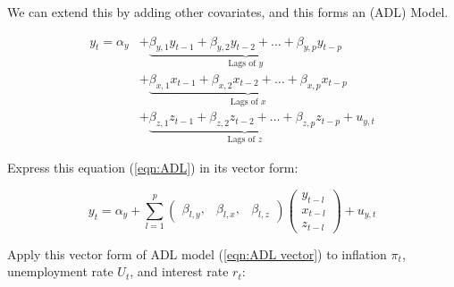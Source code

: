         We can extend this by adding other covariates, and this forms an  (ADL) Model.

        \begin{equation}
            \begin{split}
                y_t = \alpha_y &+ \underbrace{\beta_{y,1} y_{t-1} + \beta_{y,2} y_{t-2} + \dots + \beta_{y,p} y_{t-p}}_{\text{Lags of } y}\\ &+
                \underbrace{\beta_{x,1} x_{t-1} + \beta_{x,2} x_{t-2} + \dots + \beta_{x,p} x_{t-p}}_{\text{Lags of } x} \\ &+ \underbrace{\beta_{z,1} z_{t-1} + \beta_{z,2} z_{t-2} + \dots + \beta_{z,p} z_{t-p}}_{\text{Lags of } z} + u_{y,t}
            \end{split}
            \label{eqn:ADL}
        \end{equation}
        
        Express this equation (\ref{eqn:ADL}) in its vector form:

        \begin{equation}
            y_t = \alpha_y + \sum_{l=1}^p \begin{pmatrix}
                \beta_{l,y}, & \beta_{l,x}, & \beta_{l,z}
            \end{pmatrix}
            \begin{pmatrix}
                y_{t-l}\\
                x_{t-l}\\
                z_{t-l}
            \end{pmatrix}
            +u_{y,t}
            \label{eqn:ADL vector}
        \end{equation}

        Apply this vector form of ADL model (\ref{eqn:ADL vector}) to inflation $\pi_t$, unemployment rate $U_t$, and interest rate $r_t$:

